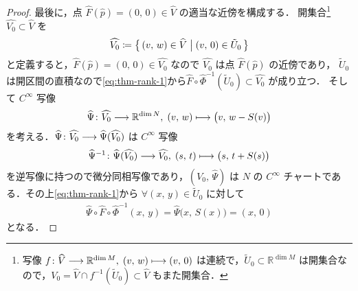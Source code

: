 \documentclass[TQFT_main]{subfiles}
\begin{document}
\begin{proof}
    最後に，点 $\widehat{F} (\widehat{p}) = (0,\, 0) \in \widehat{V}$ の適当な近傍を構成する．
    開集合\footnote{写像 $f \colon \widehat{V} \longrightarrow \mathbb{R}^{\dim M},\; (v,\, w) \longmapsto (v,\, 0)$ は連続で，$\tilde{U}_0 \subset \mathbb{R}^{\dim M}$ は開集合なので，$V_0 = \widehat{V} \cap f^{-1}(\tilde{U}_0) \subset \widehat{V}$ もまた開集合．} 
    $\widehat{V_0} \subset \widehat{V}$ を
    \begin{align}
        \widehat{V_0} \coloneqq \bigl\{\, (v,\, w) \in \widehat{V} \bigm| (v,\, 0) \in \tilde{U}_0 \,\bigr\} 
    \end{align}
    と定義すると，$\widehat{F} (\widehat{p}) = (0,\, 0) \in \widehat{V_0}$ なので $\widehat{V_0}$ は点 $\widehat{F} (\widehat{p})$ の近傍であり，
    $\tilde{U}_0$ は開区間の直積なので\eqref{eq:thm-rank-1}から$\widehat{F} \circ \widehat{\Phi}^{-1}(\tilde{U}_0) \subset \widehat{V_0}$ が成り立つ．
    そして $C^\infty$ 写像
    \begin{align}
        \widehat{\Psi} \colon \widehat{V_0} \longrightarrow \mathbb{R}^{\dim N},\; (v,\, w) \longmapsto \bigl( v,\, w - S(v) \bigr) 
    \end{align}
    を考える．$\widehat{\Psi} \colon \widehat{V_0} \longrightarrow \widehat{\Psi}(\widehat{V_0})$ は $C^\infty$ 写像
    \begin{align}
        \widehat{\Psi}^{-1} \colon \widehat{\Psi}(\widehat{V_0}) \longrightarrow \widehat{V_0},\; (s,\, t) \longmapsto \bigl( s,\, t + S(s) \bigr) 
    \end{align}
    を逆写像に持つので微分同相写像であり，$(V_0,\, \widehat{\Psi})$ は $N$ の $C^\infty$ チャートである．その上\eqref{eq:thm-rank-1}から $\forall (x,\, y) \in \tilde{U}_0$ に対して
    \begin{align}
        \label{eq:thm-rank-ans}
        \widehat{\Psi} \circ \widehat{F} \circ \widehat{\Phi}^{-1}(x,\, y) = \widehat{\Psi}\bigl(x,\, S(x)\bigr) = (x,\, 0)
    \end{align}
    となる．


\end{proof}
\end{document}
